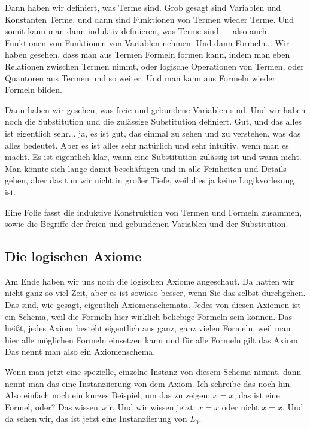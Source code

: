 \begin{spoken-clean}[00:01:27 - 00:02:48]
Dann haben wir definiert, was Terme sind. Grob gesagt sind Variablen und Konstanten Terme, und dann sind Funktionen von Termen wieder Terme. Und somit kann man dann induktiv definieren, was Terme sind --- also auch Funktionen von Funktionen von Variablen nehmen. Und dann Formeln... Wir haben gesehen, dass man aus Termen Formeln formen kann, indem man eben Relationen zwischen Termen nimmt, oder logische Operationen von Termen, oder Quantoren aus Termen und so weiter. Und man kann aus Formeln wieder Formeln bilden.

Dann haben wir gesehen, was freie und gebundene Variablen sind. Und wir haben noch die Substitution und die zulässige Substitution definiert. Gut, und das alles ist eigentlich sehr... ja, es ist gut, das einmal zu sehen und zu verstehen, was das alles bedeutet. Aber es ist alles sehr natürlich und sehr intuitiv, wenn man es macht. Es ist eigentlich klar, wann eine Substitution zulässig ist und wann nicht. Man könnte sich lange damit beschäftigen und in alle Feinheiten und Details gehen, aber das tun wir nicht in großer Tiefe, weil dies ja keine Logikvorlesung ist.
\end{spoken-clean}

\begin{meta-note}
Eine Folie fasst die induktive Konstruktion von Termen und Formeln zusammen, sowie die Begriffe der freien und gebundenen Variablen und der Substitution.
\end{meta-note}

\subsection{Die logischen Axiome}

\begin{spoken-clean}[00:02:48 - 00:04:41]
Am Ende haben wir uns noch die logischen Axiome angeschaut. Da hatten wir nicht ganz so viel Zeit, aber es ist sowieso besser, wenn Sie das selbst durchgehen. Das sind, wie gesagt, eigentlich Axiomenschemata. Jedes von diesen Axiomen ist ein Schema, weil die Formeln hier wirklich beliebige Formeln sein können. Das heißt, jedes Axiom besteht eigentlich aus ganz, ganz vielen Formeln, weil man hier alle möglichen Formeln einsetzen kann und für alle Formeln gilt das Axiom. Das nennt man also ein Axiomenschema.

Wenn man jetzt eine spezielle, einzelne Instanz von diesem Schema nimmt, dann nennt man das eine Instanziierung von dem Axiom. Ich schreibe das noch hin. Also einfach noch ein kurzes Beispiel, um das zu zeigen: $x=x$, das ist eine Formel, oder? Das wissen wir. Und wir wissen jetzt: $x=x$ oder nicht $x=x$. Und da sehen wir, das ist jetzt eine Instanziierung von $L_0$.
\end{spoken-clean}

